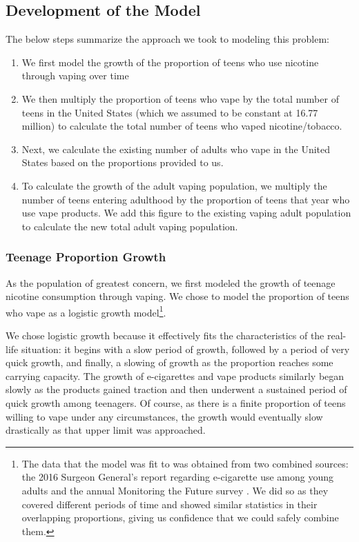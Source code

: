 \documentclass[12pt]{article}
\begin{document}
\subsection{Development of the Model}
The below steps summarize the approach we took to modeling this problem:
\begin{enumerate}
    \item We first model the growth of the proportion of teens who use nicotine through vaping over time
    \item We then multiply the proportion of teens who vape by the total number of teens in the United States (which we assumed to be constant at 16.77 million) to calculate the total number of teens who vaped nicotine/tobacco.
    \item Next, we calculate the existing number of adults who vape in the United States based on the proportions provided to us. 
    \item To calculate the growth of the adult vaping population, we multiply the number of teens entering adulthood by the proportion of teens that year who use vape products. We add this figure to the existing vaping adult population to calculate the new total adult vaping population.
\end{enumerate}

\subsubsection{Teenage Proportion Growth}
As the population of greatest concern, we first modeled the growth of teenage nicotine consumption through vaping. We chose to model the proportion of teens who vape as a logistic growth model\footnote{The data that the model was fit to was obtained from two combined sources: the 2016 Surgeon General's report regarding e-cigarette use among young adults \cite{cdcTeenVaping} and the annual Monitoring the Future survey \cite{mtfData}. We did so as they covered different periods of time and showed similar statistics in their overlapping proportions, giving us confidence that we could safely combine them.}.

We chose logistic growth because it effectively fits the characteristics of the real-life situation: it begins with a slow period of growth, followed by a period of very quick growth, and finally, a slowing of growth as the proportion reaches some carrying capacity. The growth of e-cigarettes and vape products similarly began slowly as the products gained traction and then underwent a sustained period of quick growth among teenagers. Of course, as there is a finite proportion of teens willing to vape under any circumstances, the growth would eventually slow drastically as that upper limit was approached.
\end{document}

